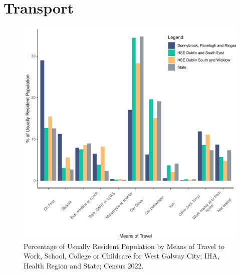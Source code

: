 \documentclass{article}
\begin{document}
\section{Transport}\label{sect:Trans}
\begin{figure}[H]
	\centering
	\includegraphics[width = 120mm]{../figures/TravelED.pdf}
	\caption{Percentage of Usually Resident Population by Means of Travel to Work, School, College or Childcare for West Galway City; IHA, Health Region and State; Census 2022.}
	\label{fig:vbnv}
	\end{figure}
\end{document}
